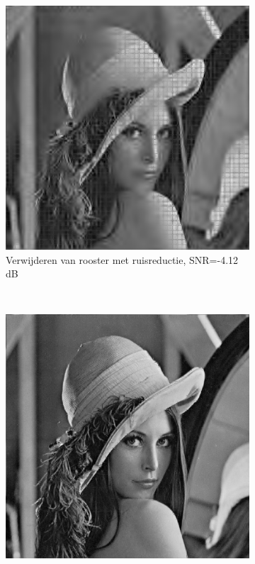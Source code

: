 \begin{figure}
    \centering
    \begin{subfigure}[b]{0.4\textwidth}
        \includegraphics[width=\textwidth]{../src/denoising/grid/lena_grid_denoise}
        \caption{Verwijderen van rooster met ruisreductie, SNR=-4.12 dB }
        \label{fig:roster_denoising}
    \end{subfigure}
    ~ %
    \begin{subfigure}[b]{0.4\textwidth}
        \includegraphics[width=\textwidth]{../src/denoising/grid/lena_fixed}

\end{subfigure}
\end{figure}
